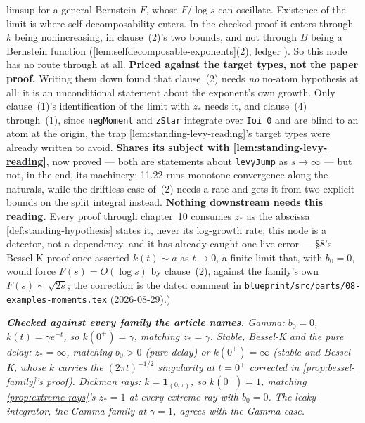 \begin{lemma}
{limsup for a general Bernstein $F$, whose $F/\log s$ can oscillate. Existence of the limit is where
self-decomposability enters. In the checked proof it enters through $k$ being nonincreasing, in
clause~(2)'s two bounds, and not through $B$ being a Bernstein function
(\ref{lem:selfdecomposable-exponents}(2), ledger ). So this node has no route through
 at all.
\textbf{Priced against the target types, not the paper proof.} Writing them down found that
clause~(2) needs \emph{no} no-atom hypothesis at all: it is an unconditional statement about the
exponent's own growth. Only clause~(1)'s identification of the limit with $z_*$ needs it, and
clause~(4) through~(1), since \texttt{negMoment} and \texttt{zStar} integrate over \texttt{Ioi 0} and are
blind to an atom at the origin, the trap \ref{lem:standing-levy-reading}'s target types were
already written to avoid.
\textbf{Shares its subject with \ref{lem:standing-levy-reading}}, now proved --- both are
statements about \texttt{levyJump} as $s \to \infty$ --- but not, in the end, its machinery: 11.22
runs monotone convergence along the naturals, while the driftless case of~(2) needs a rate and gets
it from two explicit bounds on the split integral instead.
\textbf{Nothing downstream needs this reading.} Every proof through chapter~10 consumes $z_*$ as
the abscissa \ref{def:standing-hypothesis} states it, never its log-growth rate; this node is a
detector, not a dependency, and it has already caught one live error --- \S8's Bessel-K proof once
asserted $k(t) \sim a$ as $t \to 0$, a finite limit that, with $b_0 = 0$, would force
$F(s) = O(\log s)$ by clause~(2), against the family's own $F(s) \sim \sqrt{2s}$; the correction is
the dated comment in \texttt{blueprint/src/parts/08-examples-moments.tex} (2026-08-29).)}

\emph{\textbf{Checked against every family the article names.} Gamma: $b_0 = 0$,
$k(t) = \gamma e^{-t}$, so $k(0^+) = \gamma$, matching $z_* = \gamma$. Stable, Bessel-K and the
pure delay: $z_* = \infty$, matching $b_0 > 0$ (pure delay) or $k(0^+) = \infty$ (stable and
Bessel-K, whose $k$ carries the $(2\pi t)^{-1/2}$ singularity at $t = 0^+$ corrected in
\ref{prop:bessel-family}'s proof). Dickman rays: $k = \mathbf{1}_{(0,\tau)}$, so $k(0^+) = 1$,
matching \ref{prop:extreme-rays}'s $z_* = 1$ at every extreme ray with $b_0 = 0$. The leaky
integrator, the Gamma family at $\gamma = 1$, agrees with the Gamma case.}
\end{lemma}

